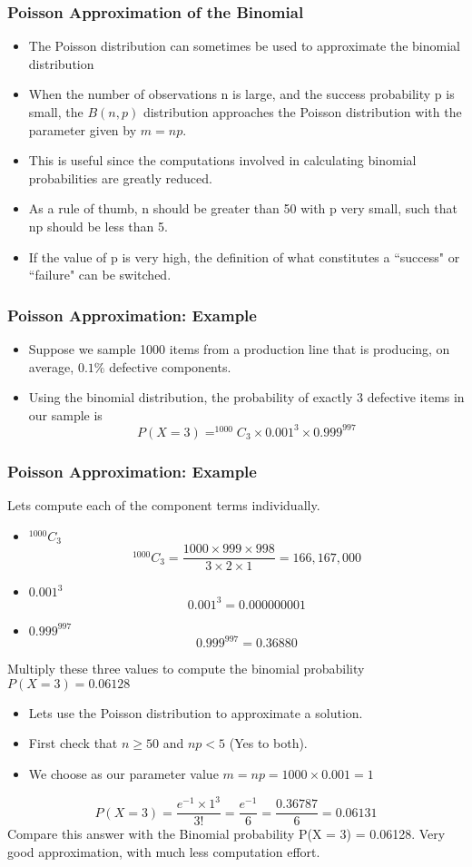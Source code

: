 
	\frametitle{Poisson Approximation of the Binomial}
	\begin{itemize}
		\item The Poisson distribution can sometimes be used to approximate the
		binomial distribution
		\item When the number of observations n is large, and the success probability
		p is small, the $B(n,p)$ distribution approaches the Poisson distribution
		with the parameter given by $m = np$.
		\item This is useful since the computations involved in calculating binomial
		probabilities are greatly reduced.
		\item As a rule of thumb, n should be greater than 50 with p very small, such
		that np should be less than 5.
		\item If the value of p is very high, the definition of what constitutes a
		``success" or ``failure" can be switched.
	\end{itemize}



	\frametitle{Poisson Approximation: Example}
	
	\begin{itemize}
		\item Suppose we sample 1000 items from a production line that is producing, on
		average, $0.1\%$ defective components.
		\item Using the binomial distribution, the probability of exactly 3 defective items in
		our sample is
		\[P(X = 3) = ^{1000}C_{3} \times 0.001^{3} \times 0.999^{997}\]
	\end{itemize}

	\frametitle{Poisson Approximation: Example}
	Lets compute each of the component terms individually.
	
	\begin{itemize}
		\item $^{1000}C_{3}$
		\[^{1000}C_{3} = \frac{1000 \times 999 \times 998}{3 \times 2 \times 1} = 166,167,000\]
		\item $0.001^3$
		\[0.001^3 = 0.000000001\]
		\item $0.999^{997}$
		\[0.999^{997} = 0.36880\]
	\end{itemize}
	
	
	Multiply these three values to compute the binomial probability
	$P(X = 3) = 0.06128$


	\begin{itemize}
		\item Lets use the Poisson distribution to approximate a solution.
		\item First check that $n \geq 50$ and $np < 5$ (Yes to both).
		\item We choose as our parameter value $m = np = 1000 \times 0.001 = 1$
	\end{itemize}
	\[P(X = 3) = \frac{e^{-1} \times 1^3}{3!} = \frac{e^{-1}}{6} = \frac{0.36787}{6} = 0.06131 \]
	Compare this answer with the Binomial probability
	P(X = 3) = 0.06128.
	Very good approximation, with much less computation effort.



